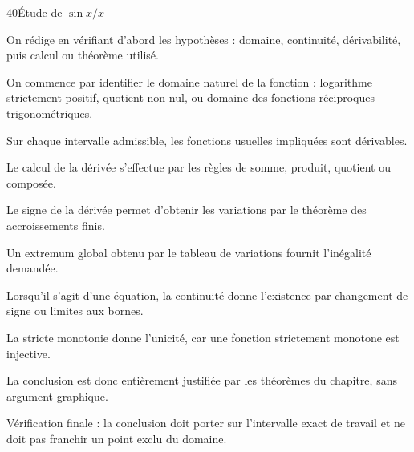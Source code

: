 \documentclass[11pt,a4paper]{article}
\begin{document}
\begin{corrbox}{40}{Étude de $\sin x/x$}

\begin{methodebox}
On rédige en vérifiant d'abord les hypothèses : domaine, continuité, dérivabilité, puis calcul ou théorème utilisé.
\end{methodebox}

On commence par identifier le domaine naturel de la fonction : logarithme strictement positif, quotient non nul, ou domaine des fonctions réciproques trigonométriques.


Sur chaque intervalle admissible, les fonctions usuelles impliquées sont dérivables.


Le calcul de la dérivée s'effectue par les règles de somme, produit, quotient ou composée.


Le signe de la dérivée permet d'obtenir les variations par le théorème des accroissements finis.


Un extremum global obtenu par le tableau de variations fournit l'inégalité demandée.


Lorsqu'il s'agit d'une équation, la continuité donne l'existence par changement de signe ou limites aux bornes.


La stricte monotonie donne l'unicité, car une fonction strictement monotone est injective.


La conclusion est donc entièrement justifiée par les théorèmes du chapitre, sans argument graphique.


\begin{attentionbox}
Vérification finale : la conclusion doit porter sur l'intervalle exact de travail et ne doit pas franchir un point exclu du domaine.
\end{attentionbox}

\end{corrbox}
\end{document}
